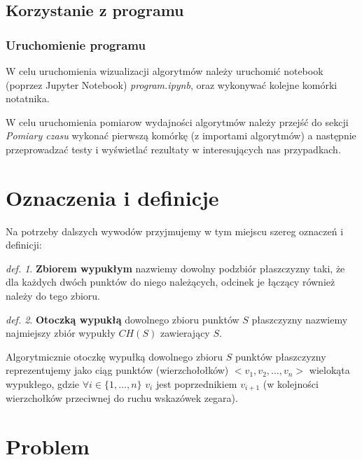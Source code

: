\documentclass[11pt]{article}
\theoremstyle{remark} \newtheorem{definition}{def.}
\theoremstyle{definition} \newtheorem{twierdzenie}{tw.}
\newcommand{\bold}[1]{\textbf{#1}}
\begin{document}
\subsection{Korzystanie z programu}

\subsubsection{Uruchomienie programu}

W celu uruchomienia wizualizacji algorytmów należy uruchomić notebook (poprzez Jupyter Notebook) \emph{program.ipynb}, oraz wykonywać kolejne komórki notatnika.

W celu uruchomienia pomiarow wydajności algorytmów należy przejść do sekcji \emph{Pomiary czasu} wykonać pierwszą komórkę (z importami algorytmów) a następnie przeprowadzać testy i wyświetlać rezultaty w 
interesujących nas przypadkach. 


\section{Oznaczenia i definicje}

Na potrzeby dalszych wywodów przyjmujemy w tym miejscu szereg oznaczeń i definicji:\\

\begin{definition}
    \bold{Zbiorem wypukłym} nazwiemy dowolny podzbiór płaszczyzny taki, że dla każdych dwóch punktów do niego należących, odcinek je łączący również należy do tego zbioru.
\end{definition}

\medskip

\begin{definition}
    \bold{Otoczką wypukłą} dowolnego zbioru punktów $S$ płaszczyzny nazwiemy najmiejszy zbiór wypukły $CH(S)$ zawierający $S$. 
\end{definition}

\medskip

Algorytmicznie otoczkę wypułką dowolnego zbioru $S$ punktów płaszczyzny reprezentujemy jako ciąg punktów (wierzchołołków) $<v_1, v_2, \ldots, v_n>$ wielokąta wypukłego, gdzie $\forall i \in \{1, \ldots, n\}$ $v_i$ jest 
poprzednikiem $v_{i+1}$ (w kolejności wierzchołków przeciwnej do ruchu wskazówek zegara).


\section{Problem}
\end{document}
